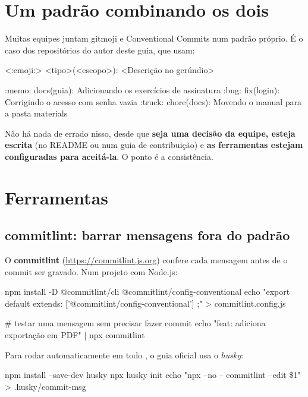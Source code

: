 \section{Um padrão combinando os dois}

Muitas equipes juntam gitmoji e Conventional Commits num padrão próprio. É o caso dos repositórios do autor deste guia, que usam:

\begin{bashcode}
<:emoji:> <tipo>(<escopo>): <Descrição no gerúndio>

:memo: docs(guia): Adicionando os exercícios de assinatura
:bug: fix(login): Corrigindo o acesso com senha vazia
:truck: chore(docs): Movendo o manual para a pasta materials
\end{bashcode}

Não há nada de errado nisso, desde que \textbf{seja uma decisão da equipe, esteja escrita} (no README ou num guia de contribuição) e \textbf{as ferramentas estejam configuradas para aceitá-la}. O ponto é a consistência.

\section{Ferramentas}
\label{sec:commitlint}

\subsection*{commitlint: barrar mensagens fora do padrão}

O \textbf{commitlint} (\url{https://commitlint.js.org}) confere cada mensagem antes de o commit ser gravado. Num projeto com Node.js:

\begin{bashcode}
npm install -D @commitlint/cli @commitlint/config-conventional
echo "export default { extends: ['@commitlint/config-conventional'] };" > commitlint.config.js

# testar uma mensagem sem precisar fazer commit
echo "feat: adiciona exportação em PDF" | npx commitlint
\end{bashcode}

Para rodar automaticamente em todo , o guia oficial usa o \emph{husky}:

\begin{bashcode}
npm install --save-dev husky
npx husky init
echo "npx --no -- commitlint --edit \$1" > .husky/commit-msg
\end{bashcode}

